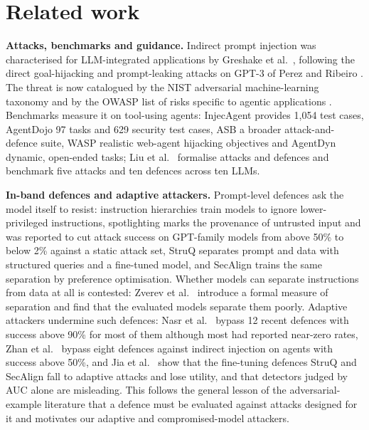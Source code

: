 \documentclass[11pt]{article}
\begin{document}
\hypertarget{related-work}{%
\FloatBarrier
\section{Related work}\label{related-work}}

\textbf{Attacks, benchmarks and guidance.} Indirect prompt injection was characterised for LLM-integrated applications by Greshake et al.~\cite{greshake}, following the direct goal-hijacking and prompt-leaking attacks on GPT-3 of Perez and Ribeiro \cite{perez}. The threat is now catalogued by the NIST adversarial machine-learning taxonomy \cite{nist100} and by the OWASP list of risks specific to agentic applications \cite{owasp}. Benchmarks measure it on tool-using agents: InjecAgent \cite{injecagent} provides 1,054 test cases, AgentDojo \cite{agentdojo} 97 tasks and 629 security test cases, ASB \cite{asb} a broader attack-and-defence suite, WASP \cite{wasp} realistic web-agent hijacking objectives and AgentDyn \cite{agentdyn} dynamic, open-ended tasks; Liu et al.~\cite{liu24} formalise attacks and defences and benchmark five attacks and ten defences across ten LLMs.

\textbf{In-band defences and adaptive attackers.} Prompt-level defences ask the model itself to resist: instruction hierarchies \cite{wallace} train models to ignore lower-privileged instructions, spotlighting \cite{hines} marks the provenance of untrusted input and was reported to cut attack success on GPT-family models from above 50\% to below 2\% against a static attack set, StruQ \cite{struq} separates prompt and data with structured queries and a fine-tuned model, and SecAlign \cite{secalign} trains the same separation by preference optimisation. Whether models can separate instructions from data at all is contested: Zverev et al.~\cite{zverev} introduce a formal measure of separation and find that the evaluated models separate them poorly. Adaptive attackers undermine such defences: Nasr et al.~\cite{nasr} bypass 12 recent defences with success above 90\% for most of them although most had reported near-zero rates, Zhan et al.~\cite{zhan25} bypass eight defences against indirect injection on agents with success above 50\%, and Jia et al.~\cite{jia25} show that the fine-tuning defences StruQ and SecAlign fall to adaptive attacks and lose utility, and that detectors judged by AUC alone are misleading. This follows the general lesson of the adversarial-example literature that a defence must be evaluated against attacks designed for it \cite{tramer} and motivates our adaptive and compromised-model attackers.
\end{document}
